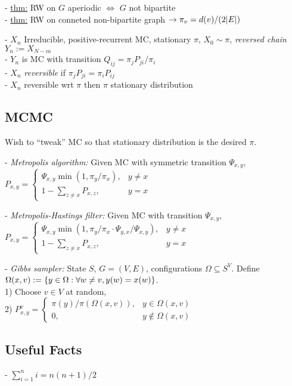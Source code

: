\documentclass[10pt]{article}
\DeclarePairedDelimiter{\set}{\lbrace}{\rbrace}
\DeclarePairedDelimiter{\card}{\lvert}{\rvert}
\newcommand{\sset}{\subseteq}
\begin{document}
\begin{multicols}{3}
- \underline{thm:} RW on $G$ aperiodic $\iff$ $G$ not bipartite \\
- \underline{thm:} RW on conneted non-bipartite graph $\to \pi_v = d(v) / (2\card E)$

- $X_n$ Irreducible, positive-recurrent MC, stationary $\pi$, $X_0\sim \pi$,
\emph{reversed chain} $Y_n := X_{N-m}$ \\
- $Y_n$ is MC with transition $Q_{ij} = \pi_j P_{ji} / \pi_i$ \\
- $X_n$ \emph{reversible} if $\pi_j P_{ji} = \pi_i P_{ij}$ \\
- $X_n$ reversible wrt $\pi$ then $\pi$ stationary distribution

\subsection*{MCMC}
Wish to ``tweak'' MC so that stationary distribution is the desired $\pi$.

- \emph{Metropolis algorithm:} Given MC with symmetric transition $\Psi_{x, y}$, \\
$P_{x, y} =
\begin{cases}
  \Psi_{x, y}\min (1, \pi_y/\pi_x), &y\neq x \\
  1-\sum_{z\neq x} P_{x, z}, &y=x
\end{cases}
$

- \emph{Metropolis-Hastings filter:} Given MC with transition $\Psi_{x, y}$, \\
$P_{x, y} =
\begin{cases}
  \Psi_{x, y}\min (1, \pi_y/\pi_x\cdot \Psi_{y, x}/\Psi_{x, y}), &y\neq x \\
  1-\sum_{z\neq x} P_{x, z}, &y=x
\end{cases}
$

- \emph{Gibbs sampler:} State $S$, $G = (V, E)$,
configurations $\Omega\sset S^V$.
Define $\Omega(x, v) := \set{y\in \Omega: \forall w\neq v, y(w) = x(w)}$. \\
1) Choose $v\in V$ at random, \\
2) $P_{x, y}^v =
\begin{cases}
  \pi(y)/\pi(\Omega(x, v)), &y\in \Omega(x, v) \\
  0, &y\notin \Omega(x, v)
\end{cases}
$

\subsection*{Useful Facts}
- $\sum_{i=1}^n i = n(n+1)/2$


\end{multicols}
\end{document}
